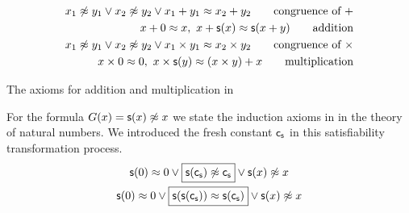 \begin{table}[hbt]
	\begin{align*}
		x_1\not\approx y_1\lor x_2\not\approx y_2\lor x_1+y_1 \approx x_2+y_2
		\tag*{congruence of \( + \)}
		\\
		x + 0 \approx x,\
		x+\mathsf{s}(x) \approx \mathsf{s}(x+y)
		\tag*{addition}
		\\
		x_1\not\approx y_1\lor x_2\not\approx y_2\lor x_1\times y_1 \approx x_2\times y_2
		\tag*{congruence of \( \times \)}
		\\
		x \times 0 \approx 0,\
		x \times\mathsf{s}(y) \approx (x\times y) + x
		\tag*{multiplication}
	\end{align*}
	\caption{The axioms for addition and multiplication in \CNF}\label{tab:addition:multiplication}
\end{table}

\begin{example} For the formula \( G(x)=\mathsf{s}(x)\not\approx x \) we state the induction axioms in \CNF{} in the theory of natural numbers.
	We introduced the fresh constant \( \mathsf{c}_{\mathsf{s}} \) in this satisfiability transformation process.
	\begin{gather*}
	\mathsf{s}(0)\approx 0 \lor \boxed{\mathsf{s}(\mathsf{c}_{\mathsf{s}})\not\approx \mathsf{c}_{\mathsf{s}}} \lor \mathsf{s}(x)\not\approx x \\
	\mathsf{s}(0)\approx 0 \lor \boxed{\mathsf{s}(\mathsf{s}(\mathsf{c}_{\mathsf{s}}))\approx \mathsf{s}(\mathsf{c}_{\mathsf{s}})} \lor \mathsf{s}(x)\not\approx x
	\end{gather*}
\end{example}


